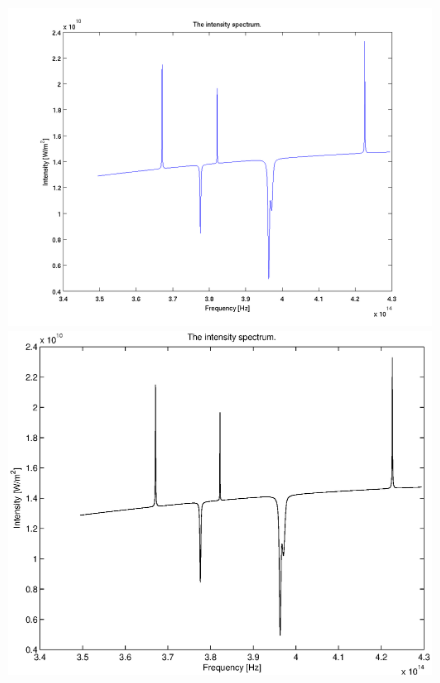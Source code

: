 \documentclass[10pt, a4paper]{article}
\begin{document}
\begin{figure}[hbt]
\begin{center}
\ifpdf
	\includegraphics[width=\linewidth]{../img/spectrum.png}
\else
	\includegraphics[width=\linewidth]{../img/spectrum.eps}
\fi
\end{center}
\caption{}
\label{fig:spec}
\end{figure}
\end{document}
